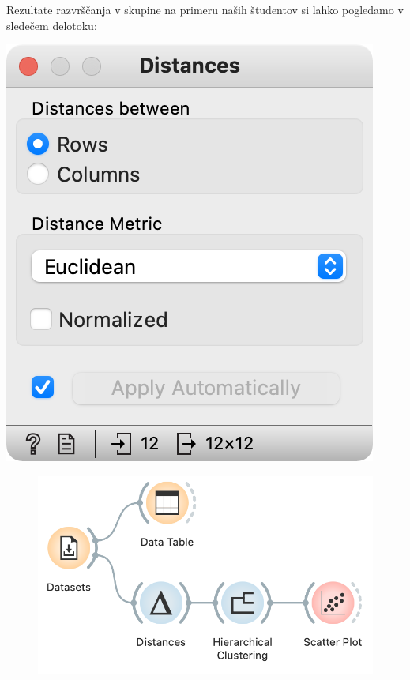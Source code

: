 \newpage

Rezultate razvrščanja v skupine na primeru naših študentov si lahko pogledamo v sledečem delotoku:

\begin{marginfigure}[2cm]
    \includegraphics[width=\linewidth]{distances.png}
    \caption{}
\end{marginfigure}

\begin{figure}[h]
    \includegraphics[width=\linewidth]{hierarchical-clustering-workflow.png}%
    \caption{ }
    \label{fig:002-preprocess}
\end{figure}


